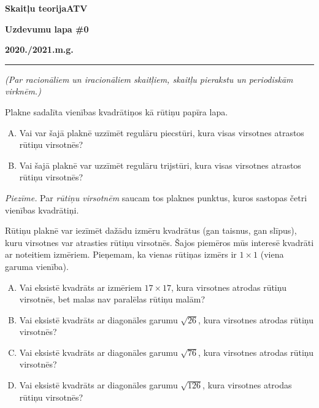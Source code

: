 \documentclass[a4paper,12pt]{article}
\begin{document}
\begin{center}
\parbox{3.5cm}{\flushleft\bf Skaitļu teorija\linebreak ATV} \hfill {\bf\LARGE Uzdevumu lapa \#0} \hfill \parbox{3.5cm}{\flushright\bf 2020./2021.m.g.} %
\end{center}

\hrule


\vspace{5pt}
{\em (Par racionāliem un iracionāliem skaitļiem, skaitļu pierakstu un periodiskām virknēm.)}


\vspace{10pt}
\begin{problem}
Plakne sadalīta vienības kvadrātiņos kā rūtiņu papīra lapa. 
\begin{enumerate}[(A)]
\item Vai var šajā plaknē uzzīmēt regulāru piecstūri, kura visas virsotnes atrastos rūtiņu virsotnēs?
\item Vai šajā plaknē var uzzīmēt regulāru trijstūri, kura visas virsotnes atrastos rūtiņu virsotnēs?
\end{enumerate}
{\em Piezīme.} Par {\em rūtiņu virsotnēm} saucam tos plaknes punktus, kuros sastopas četri vienības kvadrātiņi.
\end{problem}


\vspace{10pt}
\begin{problem} 
Rūtiņu plaknē var iezīmēt dažādu izmēru kvadrātus (gan taisnus, gan slīpus), kuru virsotnes var atrasties rūtiņu 
virsotnēs. Šajos piemēros mūs interesē kvadrāti ar noteitiem izmēriem. Pieņemam, ka vienas rūtiņas izmērs ir $1 \times 1$
(viena garuma vienība). 
\begin{enumerate}[(A)]
\item
Vai eksistē kvadrāts ar izmēriem $17 \times 17$, kura virsotnes atrodas rūtiņu virsotnēs, bet malas nav paralēlas rūtiņu malām?
\item 
Vai eksistē kvadrāts ar diagonāles garumu $\sqrt{26}$, kura virsotnes atrodas rūtiņu virsotnēs?
\item 
Vai eksistē kvadrāts ar diagonāles garumu $\sqrt{76}$, kura virsotnes atrodas rūtiņu virsotnēs?
\item 
Vai eksistē kvadrāts ar diagonāles garumu $\sqrt{126}$, kura virsotnes atrodas rūtiņu virsotnēs?
\end{enumerate}
\end{problem}
\end{document}
